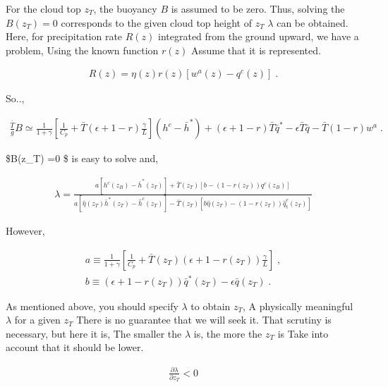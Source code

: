 For the cloud top \(z_T\), the buoyancy \(B\) is assumed to be zero.
Thus, solving the \(B(z_T)=0\) corresponds to the given cloud top height
of \(z_T\) \(\lambda\) can be obtained. Here, for precipitation rate
\(R(z)\) integrated from the ground upward, we have a problem, Using the
known function \(r(z)\) Assume that it is represented.

\begin{eqnarray}
  R(z)   = \eta(z) r(z) \left[ w^a(z) - q^c(z) \right] \; .
\end{eqnarray}

So..,

\begin{eqnarray}
\frac{\bar{T}}{g} B \simeq 
 \frac{1}{1+\gamma} 
 \left[ \frac{1}{C_p} + \bar{T} (\epsilon+1-r) \frac{\gamma}{L} \right]
  (h^c-\bar{h}^*)
  + (\epsilon+1-r) \bar{T} \bar{q}^* 
  - \epsilon  \bar{T} \bar{q}
  - \bar{T} (1-r) w^a \; .
\end{eqnarray}

\$B(z\_T) =0 \$ is easy to solve and,

\begin{eqnarray}
  \lambda = \frac{ a\left[ h^c(z_B)-\bar{h}^*(z_T) \right]
                  +\bar{T}(z_T)\left[ b -(1-r(z_T))q^c(z_B) \right] }
                 { a\left[ \hat{\eta}(z_T) \bar{h}^*(z_T) 
                               - \hat{h}^c(z_T) \right]
                  -\bar{T}(z_T)\left[ b \hat{\eta}(z_T) 
                                     - (1-r(z_T))\hat{q}_t^c(z_T) \right] }
\end{eqnarray}

However,

\begin{eqnarray}
a  \equiv  \frac{1}{1+\gamma}
             \left[ \frac{1}{C_p} 
                + \bar{T}(z_T) 
                  \left( \epsilon+1-r(z_T) \right) 
               \frac{\gamma}{L}                \right] \; ,\\
b  \equiv  \left(\epsilon+1-r(z_T) \right) \bar{q}^*(z_T) 
                    - \epsilon \bar{q}(z_T) \; .
\end{eqnarray}

As mentioned above, you should specify \(\lambda\) to obtain \(z_T\), A
physically meaningful \(\lambda\) for a given \(z_T\) There is no
guarantee that we will seek it. That scrutiny is necessary, but here it
is, The smaller the \(\lambda\) is, the more the \(z_T\) is Take into
account that it should be lower.

\begin{eqnarray}
  \frac{\partial \lambda}{\partial z_T} < 0
\end{eqnarray}

